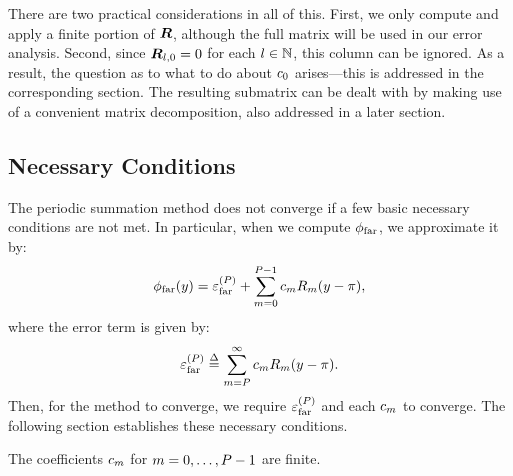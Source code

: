 There are two practical considerations in all of this. First, we only
compute and apply a finite portion of $\boldsymbol{R}$, although the full
matrix will be used in our error analysis. Second, since
$\boldsymbol{R}_{l,0} = 0$ for each $l\in\mathbb{N}$, this column can be ignored. As a
result, the question as to what to do about ${c}_{0}$
arises---this is addressed in the corresponding section. The resulting
submatrix can be dealt with by making use of a convenient matrix
decomposition, also addressed in a later section.

\subsection*{Necessary Conditions}

The periodic summation method does not converge if a few basic
necessary conditions are not met. In particular, when we compute
$\phi_{\operatorname{far}}$, we approximate it by:
\begin{align}
  \label{eq:phifar-approx}
  \phi_{\operatorname{far}}(y) = {\varepsilon}^{(P)}_{\operatorname{far}}{} + \sum_{m=0}^{P-1} c_{m} R_m(y - \pi),
\end{align}
where the error term is given by:
\begin{align}
  \label{eq:phifar-error}
  {\varepsilon}^{(P)}_{\operatorname{far}} \overset{\Delta}{=} \sum_{m=P}^{\infty} c_{m} R_m(y - \pi).
\end{align}
Then, for the method to converge, we require ${\varepsilon}^{(P)}_{\operatorname{far}}$ and each
$c_{m}$ to converge. The following section establishes
these necessary conditions.

\begin{lemma}\label{lemma:phifar-coefs}
  The coefficients $c_{m}$ for
  $m = 0, \hdots, P - 1$ are finite.
\end{lemma}

